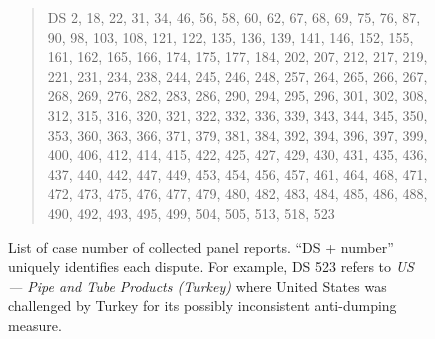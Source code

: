  

\begin{figure}[h]
    \begin{quote}
        DS 2, 
        18, 
        22, 
        31, 
        34, 
        46, 
        56, 
        58, 
        60, 
        62, 
        67, 
        68, 
        69, 
        75, 
        76, 
        87, 
        90, 
        98, 
        103, 
        108, 
        121, 
        122, 
        135, 
        136, 
        139, 
        141, 
        146, 
        152, 
        155, 
        161, 
        162, 
        165, 
        166, 
        174, 
        175, 
        177, 
        184, 
        202, 
        207, 
        212, 
        217, 
        219, 
        221, 
        231, 
        234, 
        238, 
        244, 
        245, 
        246, 
        248, 
        257, 
        264, 
        265, 
        266, 
        267, 
        268, 
        269, 
        276, 
        282, 
        283, 
        286, 
        290, 
        294, 
        295, 
        296, 
        301, 
        302, 
        308, 
        312, 
        315, 
        316, 
        320, 
        321, 
        322, 
        332, 
        336, 
        339, 
        343, 
        344, 
        345, 
        350, 
        353, 
        360, 
        363, 
        366, 
        371, 
        379, 
        381, 
        384, 
        392, 
        394, 
        396, 
        397, 
        399, 
        400, 
        406, 
        412, 
        414, 
        415, 
        422, 
        425, 
        427, 
        429, 
        430, 
        431, 
        435, 
        436, 
        437, 
        440, 
        442, 
        447, 
        449, 
        453, 
        454, 
        456, 
        457, 
        461, 
        464, 
        468, 
        471, 
        472, 
        473, 
        475, 
        476, 
        477, 
        479, 
        480, 
        482, 
        483, 
        484, 
        485, 
        486, 
        488, 
        490, 
        492, 
        493, 
        495, 
        499, 
        504, 
        505, 
        513, 
        518, 
        523
    \end{quote}
    \caption{
        List of case number of collected panel reports. ``DS + number'' uniquely identifies each dispute. For example, DS 523 refers to \textit{US — Pipe and Tube Products (Turkey)} where United States was challenged by Turkey for its possibly inconsistent anti-dumping measure.
    }
    \label{fig:ds-cases-used}
\end{figure}

